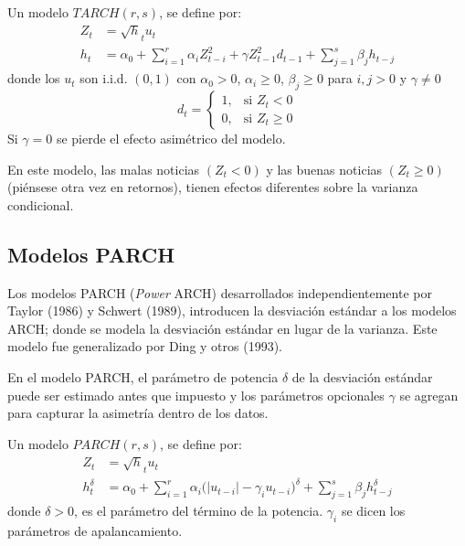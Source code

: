 \begin{definicion}
Un modelo $TARCH(r,s)$, se define por:
\begin{align*}
  Z_{t}&=\sqrt h_{t} u_{t} \\ 
 h_{t}&=\alpha_{0}+\sum_{i=1}^r {\alpha_{i}Z_{t-i}^{2}} +\gamma 
Z_{t-1}^{2}d_{t-1}+\sum_{j=1}^s {\beta_{j}h_{t-j}}
\end{align*}
donde los $u_{t}$ son i.i.d. $(0,1)$ con $\alpha_{0}>0$, $\alpha_{i}\ge 0$, 
$\beta_{j}\ge 0$ para $i,j>0$ y $\gamma \ne 0$
\[
d_{t}=\begin{cases}
       1,& \text{si }Z_{t}<0 \\ 
	   0,& \text{si }Z_{t}\ge 0
      \end{cases}
\]
Si $\gamma =0$ se pierde el efecto asim\'{e}trico del modelo.
\end{definicion}


En este modelo, las malas noticias $(Z_{t}<0)$ y las buenas noticias 
$(Z_{t}\ge 0)$ (pi\'{e}nsese otra vez en retornos), tienen efectos 
diferentes sobre la varianza condicional.

\subsection*{Modelos PARCH}

Los modelos PARCH (\textit{Power }ARCH) desarrollados 
independientemente por Taylor (1986) y Schwert (1989), introducen la 
desviaci\'{o}n est\'{a}ndar a los modelos ARCH; donde se modela la 
desviaci\'{o}n est\'{a}ndar en lugar de la varianza. Este modelo fue 
generalizado por Ding y otros (1993). 

En el modelo PARCH, el par\'{a}metro de potencia $\delta $ de la 
desviaci\'{o}n est\'{a}ndar puede ser estimado antes que impuesto y los 
par\'{a}metros opcionales $\gamma $ se agregan para capturar la 
asimetr\'{i}a dentro de los datos$.$ 

\begin{definicion}
Un modelo $PARCH(r,s)$, se define por:
\begin{align*}
 Z_{t}&=\sqrt h_{t} u_{t} \\ 
 h_{t}^{\delta }&=\alpha_{0}+\sum_{i=1}^r {\alpha_{i}(\left| u_{t-i} 
\right|-} \gamma_{i}{u_{t-i})}^{\delta }+\sum_{j=1}^s {\beta 
_{j}h_{t-j}^{\delta }}  
\end{align*}
donde $\delta >0$, es el par\'{a}metro del t\'{e}rmino de la potencia. 
$\gamma_{i}$ se dicen los par\'{a}metros de apalancamiento. 
\end{definicion}

